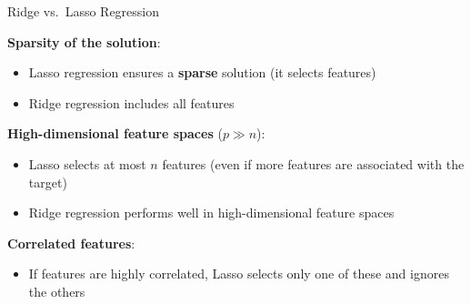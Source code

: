 \begin{frame}{Ridge vs.~Lasso Regression}

\textbf{Sparsity of the solution}:

\begin{itemize}

\item
  Lasso regression ensures a \textbf{sparse} solution (it selects
  features)
\item
  Ridge regression includes all features
\end{itemize}

\textbf{High-dimensional feature spaces} (\(p \gg n\)):

\begin{itemize}

\item
  Lasso selects at most \(n\) features (even if more features are
  associated with the target)
\item
  Ridge regression performs well in high-dimensional feature spaces
\end{itemize}

\textbf{Correlated features}:

\begin{itemize}

\item
  If features are highly correlated, Lasso selects only one of these and
  ignores the others
\end{itemize}

\end{frame}

